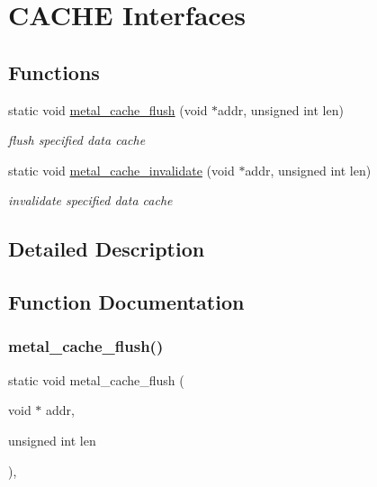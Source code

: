 \hypertarget{group__cache}{}\section{C\+A\+C\+HE Interfaces}
\label{group__cache}
\subsection*{Functions}
\begin{DoxyCompactItemize}
\item 
static void \hyperlink{group__cache_ga7a0771f070e924d322bd5a5c24cdc610}{metal\+\_\+cache\+\_\+flush} (void $\ast$addr, unsigned int len)
\begin{DoxyCompactList}\small\item\em flush specified data cache \end{DoxyCompactList}\item 
static void \hyperlink{group__cache_ga5021de21f0db9c35ed5638732a5d3e9a}{metal\+\_\+cache\+\_\+invalidate} (void $\ast$addr, unsigned int len)
\begin{DoxyCompactList}\small\item\em invalidate specified data cache \end{DoxyCompactList}\end{DoxyCompactItemize}


\subsection{Detailed Description}


\subsection{Function Documentation}
\mbox{\label{group__cache_ga7a0771f070e924d322bd5a5c24cdc610}} 
\subsubsection{\texorpdfstring{metal\+\_\+cache\+\_\+flush()}{metal\_cache\_flush()}}
{\footnotesize\ttfamily static void metal\+\_\+cache\+\_\+flush (\begin{DoxyParamCaption}\item[{void $\ast$}]{addr,  }\item[{unsigned int}]{len }\end{DoxyParamCaption})\hspace{0.3cm}{\ttfamily [inline]}, {\ttfamily [static]}}



